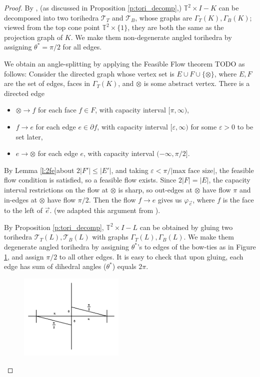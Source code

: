 \documentclass[11pt]{amsart}
\newcommand{\prpref}[1]{Proposition \ref{#1}}
\newcommand{\lemref}[1]{Lemma \ref{#1}}
\newcommand{\figref}[1]{Figure \ref{#1}}
\newcommand{\torus}{{\mathbb{T}^2}}
\newcommand{\sT}{{\mathcal{T}}}
\newcommand{\del}{\partial}
\newcommand{\vphi}{\varphi}
\newcommand{\veps}{\varepsilon}
\newcommand{\toruscomp}[1]{{\torus \times I - #1}}
\theoremstyle{plain}
\theoremstyle{definition}
\begin{document}
\begin{proof}
By \cite[Theorem 7.5]{CKP2},
(as discussed in \prpref{p:tori_decomp},)
$\toruscomp{K}$ can be decomposed
into two torihedra $\sT_T$ and $\sT_B$,
whose graphs are $\Gamma_T(K), \Gamma_B(K)$;
viewed from the top cone point $\torus \times \{1\}$,
they are both the same as the projection graph of $K$.
We make them non-degenerate angled torihedra by assigning $\theta^* = \pi/2$
for all edges.

We obtain an angle-splitting by applying the
Feasible Flow theorem TODO as follows:
Consider the directed graph whose vertex set is
$E \cup F \cup \{\otimes\}$,
where $E, F$ are the set of edges, faces in $\Gamma_T(K)$,
and $\otimes$ is some abstract vertex.
There is a directed edge
\begin{itemize}
\item $\otimes \to f$ for each face $f\in F$, with capacity interval
	$[\pi, \infty)$,
\item $f \to e$ for each edge $e \in \del f$,
	with capacity interval $[\veps, \infty)$
	for some $\veps>0$ to be set later,
\item $e \to \otimes$ for each edge $e$, with capacity interval
	$(-\infty, \pi/2]$.
\end{itemize}
By \lemref{l:2fe}about $2|F'| \leq |E'|$,
and taking $\veps < \pi / |\text{max face size}|$,
the feasible flow condition is satisfied,
so a feasible flow exists.
Since $2|F| = |E|$, the capacity interval restrictions
on the flow at $\otimes$ is sharp, so out-edges at $\otimes$
have flow $\pi$ and in-edges at $\otimes$ have flow $\pi/2$.
Then the flow $f \to e$ gives us $\vphi_{\vec{e}}$,
where $f$ is the face to the left of $\vec{e}$.
(we adapted this argument from \cite{BandS}).


By \prpref{p:tori_decomp}, $\toruscomp{L}$ can be
obtained by gluing two torihedra $\sT_T(L),\sT_B(L)$
with graphs $\Gamma_T(L),\Gamma_B(L)$.
We make them degenerate angled torihedra by assigning $\theta^*$'s
to edges of the bow-ties as in \figref{f:bowtie_angles},
and assign $\pi/2$ to all other edges.
It is easy to check that upon gluing,
each edge has sum of dihedral angles ($\theta^*$) equals $2\pi$.


\begin{figure}
\label{f:bowtie_angles}
\includegraphics[width=5cm]{more_pictures/horizontal_bowtie.png}
\end{figure}



\end{proof}
\end{document}
